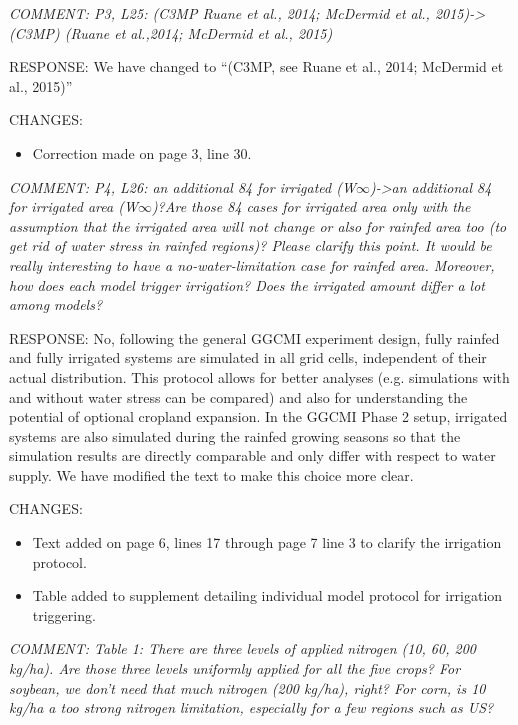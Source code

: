 \documentclass[gmd, manuscript]{copernicus} %
\begin{document}
\smallskip

\textcolor{dark-gray}{\textit{COMMENT: P3, L25: (C3MP Ruane et al., 2014; McDermid et al., 2015)-> (C3MP) (Ruane et al.,2014; McDermid et al., 2015)}}

RESPONSE: We have changed to “(C3MP, see Ruane et al., 2014; McDermid et al., 2015)”
\smallskip

CHANGES:
\begin{itemize}
    \item Correction made on page 3, line 30.
\end{itemize}

\smallskip

\textcolor{dark-gray}{\textit{COMMENT: P4, L26: an additional 84 for irrigated (W$\infty$)->an additional 84 for irrigated area (W$\infty$)?Are those 84 cases for irrigated area only with the assumption that the irrigated area will not change or also for rainfed area too (to get rid of water stress in rainfed regions)? Please clarify this point. It would be really interesting to have a no-water-limitation case for rainfed area. Moreover, how does each model trigger irrigation? Does the irrigated amount differ a lot among models?}}

RESPONSE: No, following the general GGCMI experiment design, fully rainfed and fully irrigated systems are simulated in all grid cells, independent of their actual distribution. This protocol allows for better analyses (e.g. simulations with and without water stress can be compared) and also for understanding the potential of optional cropland expansion. In the GGCMI Phase 2 setup, irrigated systems are also simulated during the rainfed growing seasons so that the simulation results are directly comparable and only differ with respect to water supply. We have modified the text to make this choice more clear.
\smallskip

CHANGES:
\begin{itemize}
    \item Text added on page 6, lines 17  through page 7 line 3 to clarify the irrigation protocol.
    \item Table added to supplement detailing individual model protocol for irrigation triggering.
\end{itemize}

\smallskip

\textcolor{dark-gray}{\textit{COMMENT: Table 1: There are three levels of applied nitrogen (10, 60, 200 kg/ha). Are those three levels uniformly applied for all the five crops? For soybean, we don’t need that much nitrogen (200 kg/ha), right? For corn, is 10 kg/ha a too strong nitrogen limitation, especially for a few regions such as US?}}
\end{document}
